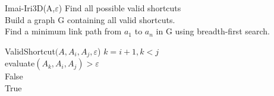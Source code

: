 \begin{algorithm}{Imai-Iri3D}{(A,$\varepsilon$)}
 Find all possible valid shortcuts \\
Build a graph G containing all valid shortcuts. \\
Find a minimum link path from $a_{1}$ to $a_{n}$  in G using breadth-first search.
      \end{algorithm} 
      
      \begin{algorithm}{ValidShortcut}{$(A, A_{i},A_{j},\varepsilon$)}
      \qfor $k = i+1, k < j$\\
       \qif evaluate$(A_{k},A_{i},A_{j}) > \varepsilon$ \\ 
       \qreturn False \qfi \qrof \\
       \qreturn True
      \end{algorithm} 
      